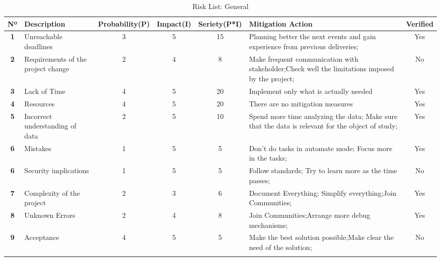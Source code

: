 \begin{longtable}{|c|p{3cm}|c|c|c|p{3cm}|c|} 
    
    \hline
     \textbf{Nº} & 
     \textbf{Description} & 
     \textbf{Probability(P)} & 
     \textbf{Impact(I)} & 
     \textbf{Seriety(P*I)} & 
     \textbf{Mitigation Action} & 
     \textbf{Verified}  
     \\ \hline
    \endfirsthead

    \hline
    \textbf{1} 
    & 
    Unreachable deadlines
    & 3 
    & 5 
    & 15 
    & Planning better the next events and gain experience from previous deliveries;
    & Yes 
    \\ \hline
    
    \textbf{2} 
    & 
    Requirements of the project change
    & 2 
    & 4 
    & 8 
    & Make frequent communication with stakeholder;Check well the limitations imposed by the project;
    & No
    \\ \hline

    \textbf{3} 
    & 
    Lack of Time
    & 4 
    & 5 
    & 20 
    & Implement only what is actually needed
    & Yes
    \\ \hline

     \textbf{4} 
    & 
    Resources
    & 4 
    & 5 
    & 20 
    & There are no mitigation measures
    & Yes
    \\ \hline

     \textbf{5} 
    & 
    Incorrect understanding of data
    & 2 
    & 5 
    & 10 
    & Spend more time analyzing the data; Make sure that the data is relevant for the object of study;
    & Yes
    \\ \hline

    \textbf{6} 
    & 
    Mistakes
    & 1 
    & 5 
    & 5 
    & Don't do tasks in automate mode; Focus more in the tasks;
    & Yes
    \\ \hline

    \textbf{6} 
    & 
    Security implications
    & 1 
    & 5 
    & 5 
    & Follow standards; Try to learn more as the time passes;
    & No
    \\ \hline

    \textbf{7} 
    & 
    Complexity of the project
    & 2 
    & 3 
    & 6 
    & Document Everything; Simplify everything;Join Communities;
    & Yes
    \\ \hline

    \textbf{8} 
    & 
    Unknown Errors
    & 2 
    & 4 
    & 8 
    & Join Communities;Arrange more debug mechanisms;
    & Yes
    \\ \hline

    \textbf{9} 
    & 
    Acceptance
    & 4 
    & 5 
    & 5 
    & Make the best solution possible;Make clear the need of the solution;
    & No
    \\ \hline

    \caption{Risk List: General} \label{tab:activity_schedule} 

\end{longtable}

